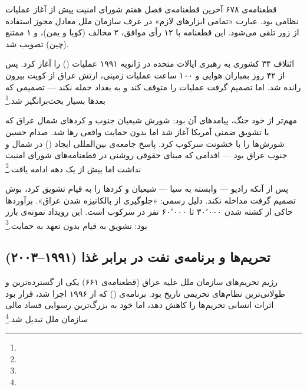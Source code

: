 \begin{tcolorbox}[legalbox, title={نکته‌ی حقوقی: قطعنامه‌ی ۶۷۸}]
قطعنامه‌ی ۶۷۸ آخرین قطعنامه‌ی فصل هفتم شورای امنیت پیش از آغاز عملیات نظامی بود. عبارت «تمامی ابزارهای لازم» در عرف سازمان ملل معادل مجوز استفاده از زور تلقی می‌شود. این قطعنامه با ۱۲ رأی موافق، ۲ مخالف (کوبا و یمن)، و ۱ ممتنع (چین) تصویب شد.
\end{tcolorbox}

ائتلاف ۳۴ کشوری به رهبری ایالات متحده در ژانویه ۱۹۹۱ عملیات  () را آغاز کرد. پس از ۴۲ روز بمباران هوایی و ۱۰۰ ساعت عملیات زمینی، ارتش عراق از کویت بیرون رانده شد. اما  تصمیم گرفت عملیات را متوقف کند و به بغداد حمله نکند — تصمیمی که بعدها بسیار بحث‌برانگیز شد.\footnote{}

مهم‌تر از خود جنگ، پیامدهای آن بود: شورش شیعیان جنوب و کردهای شمال عراق که با تشویق ضمنی آمریکا آغاز شد اما بدون حمایت واقعی رها شد. صدام حسین شورش‌ها را با خشونت سرکوب کرد. پاسخ جامعه‌ی بین‌المللی ایجاد  () در شمال و جنوب عراق بود — اقدامی که مبنای حقوقی روشنی در قطعنامه‌های شورای امنیت نداشت اما بیش از یک دهه ادامه یافت.\footnote{}

\begin{tcolorbox}[enemybox, title={فاجعه: سرکوب انتفاضه‌ی ۱۹۹۱}]
پس از آنکه رادیو  — وابسته به سیا — شیعیان و کردها را به قیام تشویق کرد، بوش تصمیم گرفت مداخله نکند. دلیل رسمی: «جلوگیری از بالکانیزه شدن عراق». برآوردها حاکی از کشته شدن ۳۰٬۰۰۰ تا ۶۰٬۰۰۰ نفر در سرکوب است. این رویداد نمونه‌ی بارز  بود: تشویق به قیام بدون تعهد به حمایت.\footnote{}
\end{tcolorbox}

\subsection{تحریم‌ها و برنامه‌ی نفت در برابر غذا (۱۹۹۱–۲۰۰۳)}
\label{subsec:ch10-iraq-sanctions}

رژیم تحریم‌های سازمان ملل علیه عراق (قطعنامه‌ی ۶۶۱) یکی از گسترده‌ترین و طولانی‌ترین نظام‌های تحریمی تاریخ بود. برنامه‌ی  () که از ۱۹۹۶ اجرا شد، قرار بود اثرات انسانی تحریم‌ها را کاهش دهد، اما خود به بزرگ‌ترین رسوایی فساد مالی سازمان ملل تبدیل شد.\footnote{}

